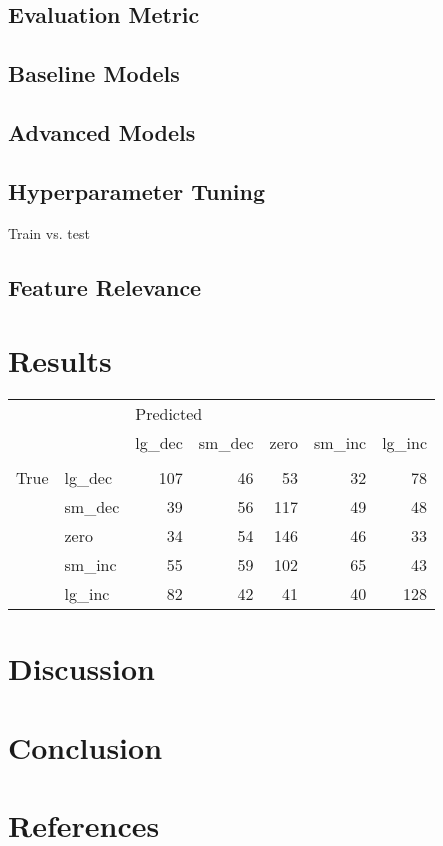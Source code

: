 \documentclass{article}
\begin{document}
	\subsection{Evaluation Metric}
	
	\subsection{Baseline Models}
	
	\subsection{Advanced Models}
	
	\subsection{Hyperparameter Tuning}
	
	Train vs. test
	
	\subsection{Feature Relevance}
	
	\section{Results}
	
	\begin{tabular}{llrrrrr}
		\toprule
		&        & \multicolumn{5}{l}{Predicted} \\
		&        &    lg\_dec & sm\_dec & zero & sm\_inc & lg\_inc \\
		{} & {} &           &        &      &        &        \\
		\midrule
		True & lg\_dec &       107 &     46 &   53 &     32 &     78 \\
		& sm\_dec &        39 &     56 &  117 &     49 &     48 \\
		& zero &        34 &     54 &  146 &     46 &     33 \\
		& sm\_inc &        55 &     59 &  102 &     65 &     43 \\
		& lg\_inc &        82 &     42 &   41 &     40 &    128 \\
		\bottomrule
	\end{tabular}
		
	\section{Discussion}
	
	\section{Conclusion}
	
	\section{References}
	
	\cite{radioactivedecay2}
	\cite{DLS1}  

	
\printbibliography
\end{document}
